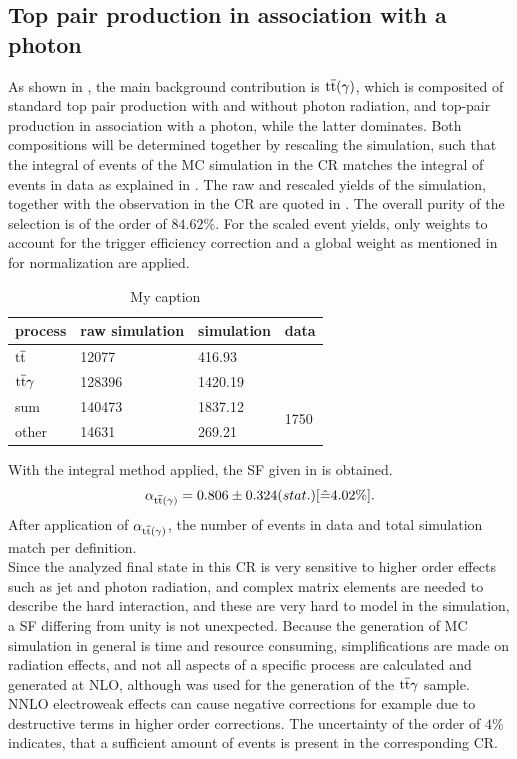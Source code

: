 \subsection{Top pair production in association with a photon}\label{sec:ttbar}
As shown in , the main background contribution is ${\mathrm{t}\overline{\mathrm{t}}}(\gamma)$, which is composited of standard top pair production with and without photon radiation, and top-pair production in association with a photon, while the latter dominates. Both compositions will be determined together by rescaling the simulation, such that the integral of events of the MC simulation in the CR matches the integral of events in data as explained in . The raw and rescaled yields of the simulation, together with the observation in the CR are quoted in . The overall purity of the selection is of the order of $84.62\%$. For the scaled event yields, only weights to account for the trigger efficiency correction and a global weight as mentioned in  for normalization are applied.
\begin{table}[tbp]
 \centering
 \caption{My caption}
 \label{tab:CRTT}
 \begin{tabular}{llll}
  
  process      & raw simulation & simulation & data                  \\\hline
  ${\mathrm{t}\overline{\mathrm{t}}}$     & 12077          & 416.93     &                       \\
  ${\mathrm{t}\overline{\mathrm{t}}}\gamma$ & 128396         & 1420.19    &                       \\\hline\hline
  sum          & 140473         & 1837.12    & \multirow{2}{*}{1750} \\
  other        & 14631          & 269.21     &                       
 \end{tabular}
\end{table}
With the integral method applied, the SF given in  is obtained.
\begin{equation}\label{eq:AlphaTT}
 \alpha_{{\mathrm{t}\overline{\mathrm{t}}}(\gamma)}=0.806 \pm 0.324 (stat.) [\hat{=}4.02\%].
\end{equation}
After application of $\alpha_{{\mathrm{t}\overline{\mathrm{t}}}(\gamma)}$, the number of events in data and total simulation match per definition.\\
Since the analyzed final state in this CR is very sensitive to higher order effects such as jet and photon radiation, and complex matrix elements are needed to describe the hard interaction, and these are very hard to model in the simulation, a SF differing from unity is not unexpected. Because the generation of MC simulation in general is time and resource consuming, simplifications are made on \eg radiation effects, and not all aspects of a specific process are calculated and generated at NLO, although \MCATNLO was used for the generation of the ${\mathrm{t}\overline{\mathrm{t}}}\gamma$ sample. NNLO electroweak effects can cause negative corrections for example due to destructive terms in higher order corrections. The uncertainty of the order of $4\%$ indicates, that a sufficient amount of events is present in the corresponding CR.\\
